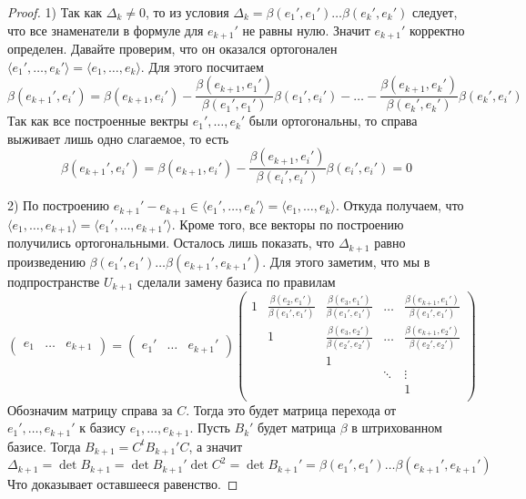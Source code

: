 \begin{proof}
1) Так как $\Delta_k\neq 0$, то из условия $\Delta_k = \beta(e_1',e_1') \ldots \beta(e_k',e_k')$ следует, что все знаменатели в формуле для $e_{k+1}'$ не равны нулю.
Значит $e_{k+1}'$ корректно определен.
Давайте проверим, что он оказался ортогонален $\langle e_1',\ldots,e_k'\rangle = \langle e_1,\ldots,e_k\rangle$.
Для этого посчитаем 
\[
\beta(e_{k+1}', e_i') = \beta(e_{k+1}, e_i') - \frac{\beta(e_{k+1}, e_1')}{\beta(e_1',e_1')}\beta(e_1', e_i') - \ldots - \frac{\beta(e_{k+1}, e_{k}')}{\beta(e_{k}',e_{k}')}\beta(e_{k}', e_i')
\]
Так как все построенные вектры $e_1',\ldots,e_k'$ были ортогональны, то справа выживает лишь одно слагаемое, то есть
\[
\beta(e_{k+1}', e_i') = \beta(e_{k+1}, e_i') - \frac{\beta(e_{k+1}, e_i')}{\beta(e_i',e_i')}\beta(e_i', e_i') = 0
\]

2) По построению $e_{k+1}'-e_{k+1} \in \langle e_1',\ldots,e_k'\rangle = \langle e_1,\ldots,e_k\rangle$.
Откуда получаем, что $\langle e_1,\ldots,e_{k+1}\rangle = \langle e_1',\ldots,e_{k+1}'\rangle$.
Кроме того, все векторы по построению получились ортогональными.
Осталось лишь показать, что $\Delta_{k+1}$ равно произведению $\beta(e_1',e_1')\ldots \beta(e_{k+1}',e_{k+1}')$.
Для этого заметим, что мы в подпространстве $U_{k+1}$ сделали замену базиса по правилам
\[
\begin{pmatrix}
{e_1}&{\ldots}&{e_{k+1}}
\end{pmatrix}
=
\begin{pmatrix}
{e_1'}&{\ldots}&{e_{k+1}'}
\end{pmatrix}
\begin{pmatrix}
{1}&{\frac{\beta(e_2,e_1')}{\beta(e_1',e_1')}}&{\frac{\beta(e_3,e_1')}{\beta(e_1',e_1')}}&{\ldots}&{\frac{\beta(e_{k+1},e_1')}{\beta(e_1',e_1')}}\\
{}&{1}&{\frac{\beta(e_3,e_2')}{\beta(e_2',e_2')}}&{\ldots}&{\frac{\beta(e_{k+1},e_2')}{\beta(e_2',e_2')}}\\
{}&{}&{1}&{}&{}\\
{}&{}&{}&{\ddots}&{\vdots}\\
{}&{}&{}&{}&{1}\\
\end{pmatrix}
\]
Обозначим матрицу справа за $C$.
Тогда это будет матрица перехода от $e_1',\ldots,e_{k+1}'$ к базису $e_1,\ldots,e_{k+1}$.
Пусть $B_k'$ будет матрица $\beta$ в штрихованном базисе.
Тогда $B_{k+1} = C^t B_{k+1}' C$, а значит 
\[
\Delta_{k+1} = \det B_{k+1}  = \det B_{k+1}' \det C^2 = \det B_{k+1}' = \beta(e_1',e_1')\ldots \beta(e_{k+1}',e_{k+1}')
\]
Что доказывает оставшееся равенство.
\end{proof}


